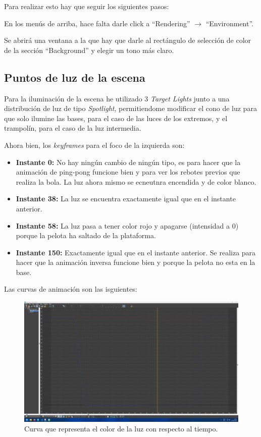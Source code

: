 \documentclass{article}
\begin{document}
\bigskip

Para realizar esto hay que seguir los siguientes pasos:

En los menús de arriba, hace falta darle click a ``Rendering'' $\rightarrow$ ``Environment''.


Se abrirá una ventana a la que hay que darle al rectángulo de selección de color de la sección ``Background'' y elegir un tono más claro.



\subsection{Puntos de luz de la escena}
Para la iluminación de la escena he utilizado 3 \textit{Target Lights} junto a una distribución de luz de tipo \textit{Spotlight}, permitiendome modificar el cono de luz para que solo ilumine las bases, para el caso de las luces de los extremos, y el trampolín, para el caso de la luz intermedia.


Ahora bien, los \textit{keyframes} para el foco de la izquierda son:

\begin{itemize}
    \item \textbf{Instante 0: }No hay ningún cambio de ningún tipo, es para hacer que la animación de ping-pong funcione bien y para ver los rebotes previos que realiza la bola. La luz ahora mismo se ecneutnra encendida y de color blanco.
    \item \textbf{Instante 38: }La luz se encuentra exactamente igual que en el instante anterior.
    \item \textbf{Instante 58: }La luz pasa a tener color rojo y apagarse (intensidad a 0) porque la pelota ha saltado de la plataforma.
    \item \textbf{Instante 150: }Exactamente igual que en el instante anterior. Se realiza para hacer que la animación inversa funcione bien y porque la pelota no esta en la base.
\end{itemize}

Las curvas de animación son las isguientes:

\begin{figure}[H]
    \centering
    \includegraphics[width=\textwidth]{imagenes/curvas/LL/filter.png}
    \caption{Curva que representa el color de la luz con respecto al tiempo.}
 \end{figure}
\end{document}
